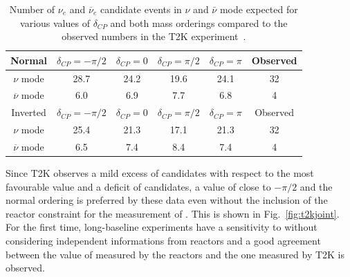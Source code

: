 \begin{table}[htbp]
    \centering
    \caption{Number of $\nu_e$ and $\overline{\nu}_e$ candidate events  in $\nu$ and $\bar{\nu}$ mode expected for various values of $\delta_{CP}$ and both mass orderings 
    compared to the observed numbers in the T2K experiment~\cite{t2k2016}.}
    \label{tab:evtnue}
    \begin{tabular}{|c|c|c|c|c|c|}
        \hline
        Normal & $\delta_{CP}= -\pi/2$ & $\delta_{CP}= 0 $ & $\delta_{CP}= \pi/2$ &  $\delta_{CP}= \pi$  & Observed\\
        \hline 
        $\nu$ mode &   28.7 & 24.2& 19.6& 24.1& 32 \\
        $\overline{\nu}$ mode &  6.0 &6.9& 7.7 &6.8 &4 \\     
        \hline
        \hline
        Inverted & $\delta_{CP}= -\pi/2$ & $\delta_{CP}= 0 $ & $\delta_{CP}= \pi/2$ &  $\delta_{CP}= \pi$  & Observed\\
        \hline 
        $\nu$ mode 			& 25.4 	& 21.3	& 17.1	& 21.3	& 32 \\
        $\overline{\nu}$ mode 	& 6.5 	& 7.4		& 8.4		& 7.4		&4 \\    
\hline
    \end{tabular}
\end{table}


Since T2K observes a mild excess of \nue candidates with respect to the most favourable value and a deficit of \nueb candidates, a value of \dcp close to $-\pi/2$ and the normal ordering is preferred by these data even without the inclusion of the reactor constraint for the measurement of \thint. This is shown in Fig.~\ref{fig:t2kjoint}. For the first time, long-baseline experiments have a sensitivity to \dcp without considering independent informations from reactors and a good agreement between the value of \thint measured by the reactors and the one measured by T2K is observed. 


